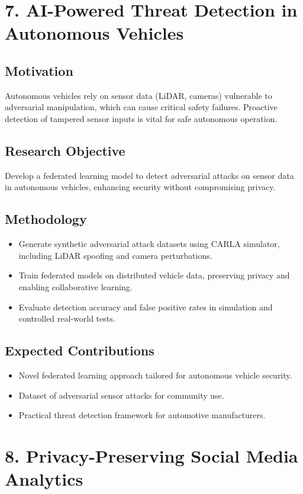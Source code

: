 \documentclass[11pt]{article}
\begin{document}
\section{7. AI-Powered Threat Detection in Autonomous Vehicles}
\label{sec:orge8f15cc}
\subsection{Motivation}
\label{sec:orgde8dfee}
Autonomous vehicles rely on sensor data (LiDAR, cameras) vulnerable to adversarial manipulation, which can cause critical safety failures. Proactive detection of tampered sensor inputs is vital for safe autonomous operation.
\subsection{Research Objective}
\label{sec:org3fa45e4}
Develop a federated learning model to detect adversarial attacks on sensor data in autonomous vehicles, enhancing security without compromising privacy.
\subsection{Methodology}
\label{sec:orgc9a020e}
\begin{itemize}
\item Generate synthetic adversarial attack datasets using CARLA simulator, including LiDAR spoofing and camera perturbations.
\item Train federated models on distributed vehicle data, preserving privacy and enabling collaborative learning.
\item Evaluate detection accuracy and false positive rates in simulation and controlled real-world tests.
\end{itemize}
\subsection{Expected Contributions}
\label{sec:orgade628c}
\begin{itemize}
\item Novel federated learning approach tailored for autonomous vehicle security.
\item Dataset of adversarial sensor attacks for community use.
\item Practical threat detection framework for automotive manufacturers.
\end{itemize}
\section{8. Privacy-Preserving Social Media Analytics}
\label{sec:org73c9190}
\end{document}
